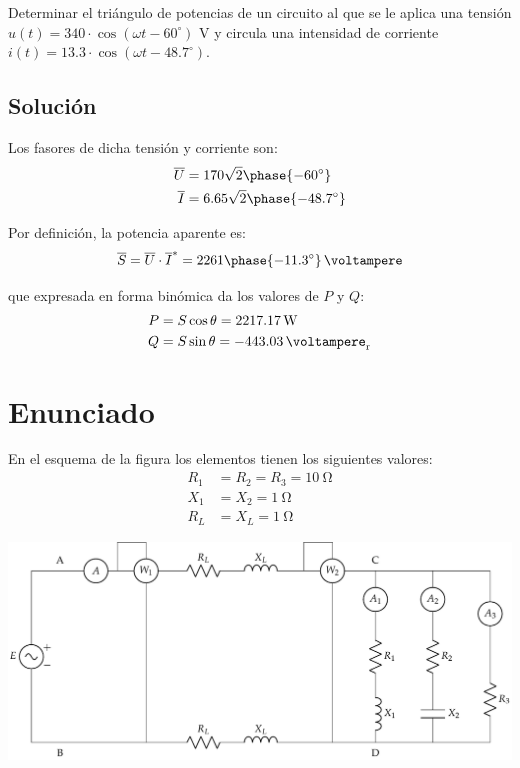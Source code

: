 Determinar el triángulo de potencias de un circuito al que se le
aplica una tensión $u(t)=340 \cdot \cos(\omega t - 60^\circ)$ V y
circula una intensidad de corriente
$i(t)= 13.3 \cdot \cos(\omega t-48.7^\circ)$.

\subsection*{Solución}

Los fasores de dicha tensión y corriente son:
\begin{align*}
  \overline{U} &= 170 \sqrt{2}\phase{\ang{-60}}\\
  \overline{I} &= 6.65\sqrt{2}\phase{\ang{-48.7}}
\end{align*}

Por definición, la potencia aparente es:
\begin{equation*}
  \overline{S} = \overline{U}\cdot\overline{I}^* = \qty[parse-numbers=false]{2261\phase{\ang{-11.3}}}{\voltampere}
\end{equation*}

que expresada en forma binómica da los valores de $P$ y $Q$:
\begin{align*}
  P &= S \cos \theta = \qty{2217.17}{\watt}\\
  Q &= S \sin \theta = \qty{-443.03}{\voltampere_r}
\end{align*}


\section{Enunciado}

En el esquema de la figura los elementos tienen los siguientes valores:
\begin{align*}
  R_1 &= R_2 = R_3 = \qty{10}{\ohm}\\
  X_1 &= X_2 = \qty{1}{\ohm}\\
  R_L &= X_L = \qty{1}{\ohm}
\end{align*}

\begin{center}
  \includegraphics[width=0.85\linewidth]{figuras/BT2_08.pdf}
\end{center}

